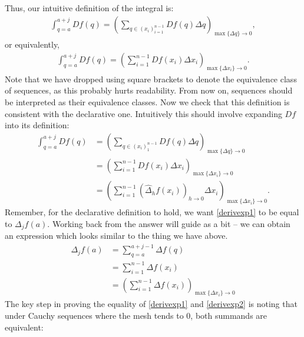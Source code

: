 \documentclass{article}
\theoremstyle{definition}
\begin{document}
Thus, our intuitive definition of the integral is:
\begin{align*}
	\int_{q=a}^{a+j}Df(q)=\left(\sum_{q\in(x_i)_{i=1}^{n-1}}Df(q)\Delta q\right)_{\max\{\Delta q\}\rightarrow0},
\end{align*}
or equivalently,
\begin{align*}
	\int_{q=a}^{a+j}Df(q)=\left(\sum_{i=1}^{n-1}Df(x_i)\Delta x_i\right)_{\max\{\Delta x_i\}\rightarrow0}.
\end{align*}
Note that we have dropped using square brackets to denote the equivalence class of sequences, as this probably hurts readability. From now on, sequences should be interpreted as their equivalence classes.
Now we check that this definition is consistent with the declarative one. Intuitively this should involve expanding $Df$ into its definition:
\begin{align}
	\int_{q=a}^{a+j}Df(q)&=\left(\sum_{q\in(x_i)_1^{n-1}}Df(q)\Delta q\right)_{\max\{\Delta q\}\rightarrow0}\nonumber\\
	&=\left(\sum_{i=1}^{n-1}Df(x_i)\Delta x_i\right)_{\max\{\Delta x_i\}\rightarrow0}\nonumber\\
	&=\left(\sum_{i=1}^{n-1}\left(\hat\Delta_h f(x_i)\right)_{h\rightarrow0}\Delta x_i\right)_{\max\{\Delta x_i\}\rightarrow0}.\label{derivexp1}
\end{align}
Remember, for the declarative definition to hold, we want \eqref{derivexp1} to be equal to $\Delta_jf(a)$. Working back from the answer will guide as a bit -- we can obtain an expression which looks similar to the thing we have above.
\begin{align}
	\Delta_jf(a)&=\sum_{q=a}^{a+j-1}\Delta f(q)\nonumber\\
	&=\sum_{i=1}^{n-1}\Delta f(x_i)\nonumber\\
	&=\left(\sum_{i=1}^{n-1}\Delta f(x_i)\right)_{\max\{\Delta x_i\}\rightarrow0}\label{derivexp2}
\end{align}
The key step in proving the equality of \eqref{derivexp1} and \eqref{derivexp2} is noting that under Cauchy sequences where the mesh tends to 0, both summands are equivalent:
\end{document}
